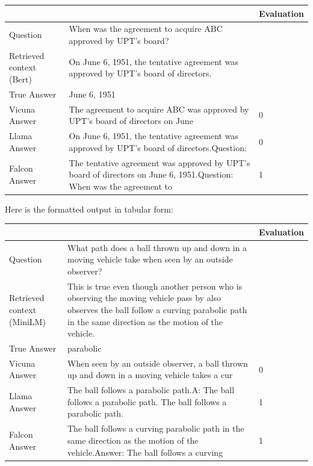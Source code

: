 \documentclass[a4paper,12pt]{article}
\begin{document}
\begin{table}[htbp]
    \centering
    \begin{tabular}{|p{3cm} p{7cm} p{2cm}|}
    \hline
    & & Evaluation \\
    \hline
    Question & When was the agreement to acquire ABC approved by UPT's board? & \\
    \hline
    Retrieved context (Bert) & On June 6, 1951, the tentative agreement was approved by UPT's board of directors. & \\
    \hline
    True Answer & June 6, 1951 & \\
    \hline
    Vicuna Answer & The agreement to acquire ABC was approved by UPT's board of directors on June & 0 \\
    \hline
    Llama Answer & On June 6, 1951, the tentative agreement was approved by UPT's board of directors.\newline Question: & 0\\
    \hline
    Falcon Answer & The tentative agreement was approved by UPT's board of directors on June 6, 1951.\newline Question: When was the agreement to & 1\\
    \hline
    \end{tabular}
\end{table}


Here is the formatted output in tabular form:

\begin{table}[htbp]
\centering
\begin{tabular}{|p{3cm} p{7cm} p{2cm}|}
\hline
& & Evaluation \\
\hline
Question & What path does a ball thrown up and down in a moving vehicle take when seen by an outside observer? & \\
\hline
Retrieved context (MiniLM) & This is true even though another person who is observing the moving vehicle pass by also observes the ball follow a curving parabolic path in the same direction as the motion of the vehicle. & \\
\hline
True Answer & parabolic & \\
\hline
Vicuna Answer & When seen by an outside observer, a ball thrown up and down in a moving vehicle takes a cur & 0 \\
\hline
Llama Answer & The ball follows a parabolic path.\newline \newline A: The ball follows a parabolic path. 
The ball follows a parabolic path. & 1 \\
\hline
Falcon Answer & The ball follows a curving parabolic path in the same direction as the motion of the vehicle.\newline \newline Answer: The ball follows a curving & 1 \\
\hline
\end{tabular}
\end{table}
\end{document}
